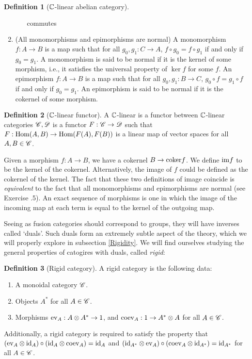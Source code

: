 \documentclass{article}
\theoremstyle{definition}
\newtheorem*{definition}{Definition}
\numberwithin{figure}{section}
\begin{document}
\begin{definition}[$\mathbb{C}$-linear abelian category]
\begin{enumerate}
\begin{itemize}
commutes
\end{itemize}
\item (All monomorphisms and epimorphisms are normal) A monomorphism $f:A\to B$ is a map such that for all $g_0,g_1: C\to A$, $f\circ g_0=f\circ g_1$ if and only if $g_0=g_1$. A monomorphism is said to be normal if it is the kernel of some morphism, i.e., it satisfies the universal property of $\ker f$ for some $f$. An epimorphism $f:A\to B$ is a map such that for all $g_0,g_1:B\to C$, $g_0\circ f=g_1\circ f$ if and only if $g_0=g_1$. An epimorphism is said to be normal if it is the cokernel of some morphism.
\end{enumerate}
\raggedleft\qedsymbol{}
\end{definition}

\begin{definition}[$\mathbb{C}$-linear functor] A $\mathbb{C}$-linear is a functor between $\mathbb{C}$-linear categories $\mathscr{C},\mathscr{D}$ is a functor $F:\mathscr{C}\to\mathscr{D}$ such that $F:\mathrm{Hom}(A,B)\to \mathrm{Hom}(F(A),F(B))$ is a linear map of vector spaces for all $A,B\in \mathscr{C}$.

\raggedleft\qedsymbol{}
\end{definition}

Given a morphism $f:A\to B$, we have a cokernel $B\to \mathrm{coker} f$. We define $\mathrm{im} f$ to be the kernel of the cokernel. Alternatively, the image of $f$ could be defined as the cokernel of the kernel. The fact that these two definitions of image coincide is \textit{equivalent} to the fact that all monomorphisms and epimorphisms are normal (see Exercise \thesection.5). An exact sequence of morphisms is one in which the image of the incoming map at each term is equal to the kernel of the outgoing map. 

Seeing as fusion categories should correspond to groups, they will have inverses called `duals'. Such duals form an extremely subtle aspect of the theory, which we will properly explore in subsection \ref{Rigidity}. We will find ourselves studying the general properties of catogires with duals, called \textit{rigid}:

\begin{definition}[Rigid category] A rigid category is the following data:

\begin{enumerate}
\item A monoidal category $\mathscr{C}$.
\item Objects $A^*$ for all $A\in \mathscr{C}$.
\item Morphisms $\mathrm{ev}_{A}: A\otimes A^*\to 1$, and $\mathrm{coev}_{A}: 1\to A^*\otimes A$ for all $A\in \mathscr{C}$.
\end{enumerate}

Additionally, a rigid category is required to satisfy the property that $(\mathrm{ev}_A \otimes \mathrm{id}_A)\circ (\mathrm{id}_A\otimes \mathrm{coev}_A)=\mathrm{id}_A$ and $(\mathrm{id}_{A^*}\otimes \mathrm{ev}_A)\circ (\mathrm{coev}_{A}\otimes \mathrm{id}_{A^*})=\mathrm{id}_{A^*}$ for all $A\in \mathscr{C}$. 

\raggedleft\qedsymbol{}
\end{definition}
\end{document}
